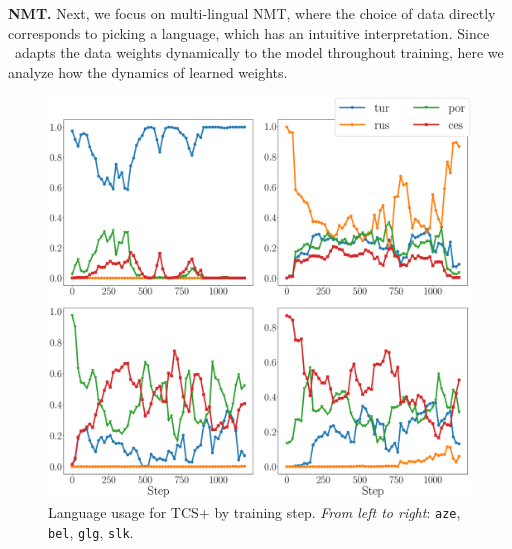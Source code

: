 \noindent \textbf{NMT.}
Next, we focus on multi-lingual NMT, where the choice of data directly corresponds to picking a language, which has an intuitive interpretation. Since \dds~adapts the data weights dynamically to the model throughout training, here we analyze how the dynamics of learned weights.

\begin{figure}
    \centering
    \includegraphics[width=0.8\columnwidth]{figs/hs_prob_plot.eps}
    \caption{\label{fig:nmt_distrib_hs}Language usage for TCS$+$\dds{} by training step. \textit{From left to right}: \texttt{aze}, \texttt{bel}, \texttt{glg}, \texttt{slk}.}
\end{figure}
